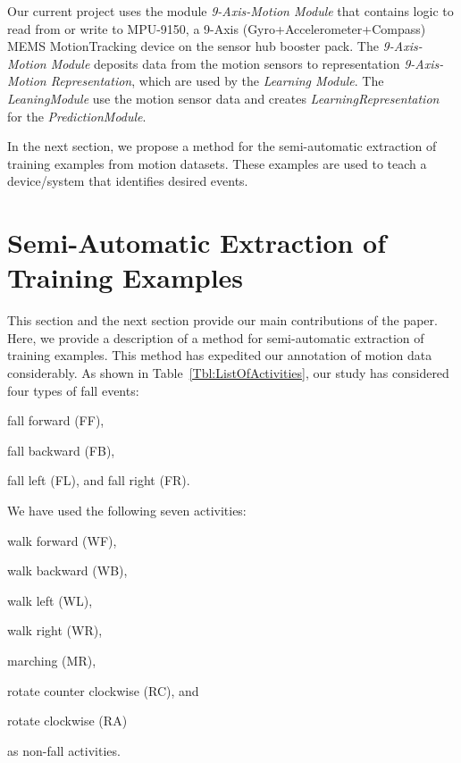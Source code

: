 \documentclass[]{IEEEtran}
\begin{document}
Our current project uses the module {\em 9-Axis-Motion Module} that contains
logic to read from or write to MPU-9150, a 9-Axis (Gyro+Accelerometer+Compass)
MEMS MotionTracking device on the sensor hub booster pack. The {\em
9-Axis-Motion Module} deposits data from the motion sensors to representation
{\em 9-Axis-Motion Representation}, which are used by the {\em Learning
Module}. The {\em LeaningModule} use the motion sensor data and creates {\em
LearningRepresentation} for the {\em PredictionModule}. 

\par 

In the next section, we propose a method for the semi-automatic extraction of
training examples from motion datasets. These examples are used to teach a
device/system that identifies desired events. 

\section{Semi-Automatic Extraction of  Training Examples}
\label{sec:SemiAutomaticExtractionOfTrainingVectors}

This section and the next section provide our main contributions of the paper.
Here, we provide a description of a method for semi-automatic extraction of
training examples. This method has expedited our annotation of motion data
considerably. As shown in Table~\ref{Tbl:ListOfActivities},  our study has
considered four types of fall events: \begin{inparaenum}[1)] \item fall forward
({\sf FF}), \item fall backward ({\sf FB}), \item fall left ({\sf FL}), and
fall right ({\sf FR}). \end{inparaenum} We have used the following seven
activities:\begin{inparaenum}[1)] \item walk forward ({\sf WF}), \item walk
backward ({\sf WB}), \item walk left ({\sf WL}), \item walk right ({\sf WR}),
\item marching ({\sf MR}), \item rotate counter clockwise ({\sf RC}), and \item
rotate clockwise ({\sf RA})  \end{inparaenum} as non-fall activities. 
\end{document}
